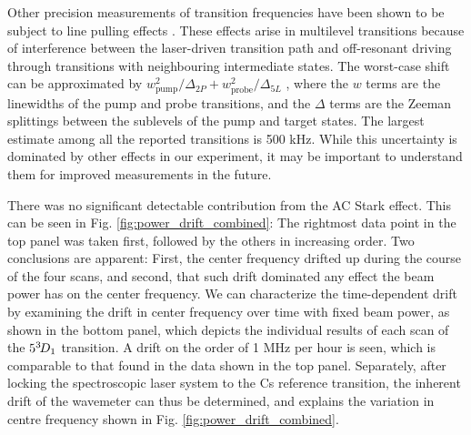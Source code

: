 	Other precision measurements of transition frequencies have been shown to be subject to line pulling effects \cite{Marsman15,Marsman15PRA}.
	These effects arise in multilevel transitions because of interference between the laser-driven transition path and off-resonant driving through transitions with neighbouring intermediate states.
	The worst-case shift can be approximated by $w_{\text{pump}}^2/\Delta_{2P} + w_{\text{probe}}^2/\Delta_{5L}$ \cite{Marsman15,Marsman15PRA}, where the $w$ terms are the linewidths of the pump and probe transitions, and the $\Delta$ terms are the Zeeman splittings between the sublevels of the pump and target states.
	The largest estimate among all the reported transitions is 500 kHz.
	While this uncertainty is dominated by other effects in our experiment, it may be important to understand them for improved measurements in the future.

	There was no significant detectable contribution from the AC Stark effect.
	This can be seen in Fig.	\ref{fig:power_drift_combined}: The rightmost data point in the top panel was taken first, followed by the others in increasing order. Two conclusions are apparent: First, the center frequency drifted up during the course of the four scans, and second, that such drift dominated any effect the beam power has on the center frequency. We can characterize the time-dependent drift by examining the drift in center frequency over time with fixed beam power, as shown in the bottom panel, which depicts the individual results of each scan of the $5^{3\!} D_1$ transition. A drift on the order of 1 MHz per hour is seen, which is comparable to that found in the data shown in the top panel. Separately, after locking the spectroscopic laser system to the Cs reference transition, the inherent drift of the wavemeter can thus be determined, and explains the variation in centre frequency shown in Fig.	\ref{fig:power_drift_combined}.


	
